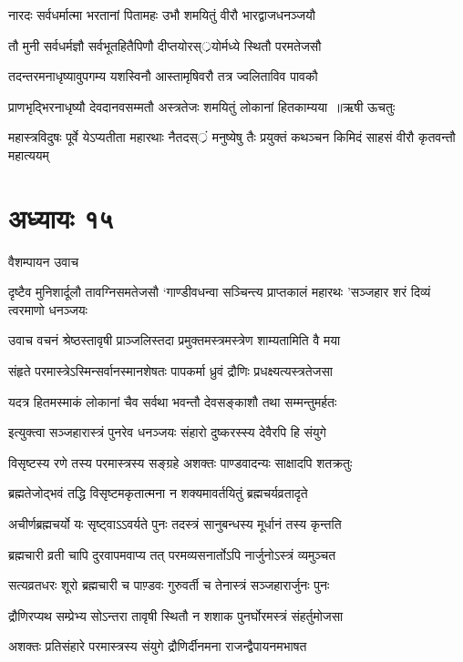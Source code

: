 \twolineshloka
{नारदः सर्वधर्मात्मा भरतानां पितामहः}
{उभौ शमयितुं वीरौ भारद्वाजधनञ्जयौ}


\twolineshloka
{तौ मुनी सर्वधर्मज्ञौ सर्वभूतहितैपिणौ}
{दीप्तयोरस््रयोर्मध्ये स्थितौ परमतेजसौ}


\twolineshloka
{तदन्तरमनाधृष्यावुपगम्य यशस्विनौ}
{आस्तामृषिवरौ तत्र ज्वलिताविव पावकौ}


\threelineshloka
{प्राणभृद्भिरनाधृष्यौ देवदानवसम्मतौ}
{अस्त्रतेजः शमयितुं लोकानां हितकाम्यया ॥ऋषी ऊचतुः}
{}


\threelineshloka
{महास्त्रविदुषः पूर्वे येऽप्यतीता महारथाः}
{नैतदस््रं मनुष्येषु तैः प्रयुक्तं कथञ्चन}
{किमिदं साहसं वीरौ कृतवन्तौ महात्ययम्}


\chapter{अध्यायः १५}
\twolineshloka
{वैशम्पायन उवाच}
{}


\threelineshloka
{दृष्टैव मुनिशार्दूलौ तावग्निसमतेजसौ}
{`गाण्डीवधन्वा सञ्चिन्त्य प्राप्तकालं महारथः}
{'सञ्जहार शरं दिव्यं त्वरमाणो धनञ्जयः}


\twolineshloka
{उवाच वचनं श्रेष्ठस्तावृषी प्राञ्जलिस्तदा}
{प्रमुक्तमस्त्रमस्त्रेण शाम्यतामिति वै मया}


\twolineshloka
{संहृते परमास्त्रेऽस्मिन्सर्वानस्मानशेषतः}
{पापकर्मा ध्रुवं द्रौणिः प्रधक्ष्यत्यस्त्रतेजसा}


\twolineshloka
{यदत्र हितमस्माकं लोकानां चैव सर्वथा}
{भवन्तौ देवसङ्काशौ तथा सम्मन्तुमर्हतः}


\twolineshloka
{इत्युक्त्वा सञ्जहारास्त्रं पुनरेव धनञ्जयः}
{संहारो दुष्करस्स्य देवैरपि हि संयुगे}


\twolineshloka
{विसृष्टस्य रणे तस्य परमास्त्रस्य सङ्ग्रहे}
{अशक्तः पाण्डवादन्यः साक्षादपि शतक्रतुः}


\twolineshloka
{ब्रह्मतेजोद्भवं तद्धि विसृष्टमकृतात्मना}
{न शक्यमावर्तयितुं ब्रह्मचर्यव्रतादृते}


\twolineshloka
{अचीर्णब्रह्मचर्यो यः सृष्ट्वाऽऽवर्यते पुनः}
{तदस्त्रं सानुबन्धस्य मूर्धानं तस्य कृन्तति}


\twolineshloka
{ब्रह्मचारी व्रती चापि दुरवापमवाप्य तत्}
{परमव्यसनार्तोऽपि नार्जुनोऽस्त्रं व्यमुञ्चत}


\twolineshloka
{सत्यव्रतधरः शूरो ब्रह्मचारी च पाण़्डवः}
{गुरुवर्ती च तेनास्त्रं सञ्जहारार्जुनः पुनः}


\twolineshloka
{द्रौणिरप्यथ सम्प्रेभ्य सोऽन्तरा तावृषी स्थितौ}
{न शशाक पुनर्घोरमस्त्रं संहर्तुमोजसा}


\twolineshloka
{अशक्तः प्रतिसंहारे परमास्त्रस्य संयुगे}
{द्रौणिर्दीनमना राजन्द्वैपायनमभाषत}


